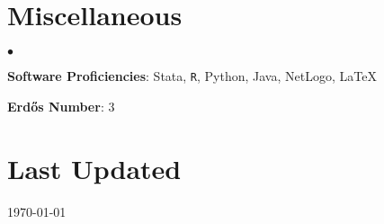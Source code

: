 \documentclass[margin,line]{res}
\newenvironment{list2}{
  \begin{list}{$\bullet$}{%
      \setlength{\itemsep}{0in}
      \setlength{\parsep}{0in} \setlength{\parskip}{0in}
      \setlength{\topsep}{0in} \setlength{\partopsep}{0in} 
      \setlength{\leftmargin}{0.2in}}}{\end{list}}
\begin{document}
\begin{resume}
\section{\sc Miscellaneous}
\begin{list2}
	\item \textbf{Software Proficiencies}: Stata, {\tt R}, Python, Java, NetLogo, \LaTeX
	\item \textbf{Erd{\H o}s Number}: 3
\end{list2}


\section{\sc Last Updated}
\today

%

\end{resume}
\end{document}
